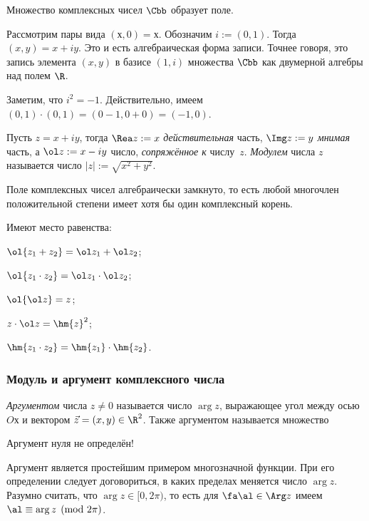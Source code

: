 \documentclass[a4paper]{article}
\begin{document}
\begin{stm}
Множество комплексных чисел $\Cbb$ образует поле.
\end{stm}

Рассмотрим пары вида $(х, 0) = х$. Обозначим $i := (0,1)$. Тогда $(x,y) = x+iy$. Это и есть алгебраическая
форма записи. Точнее говоря, это запись элемента $(x,y)$ в базисе $(1,i)$ множества $\Cbb$ как двумерной
алгебры над полем $\R$.

Заметим, что $i^2= -1$. Действительно, имеем $(0,1)\cdot(0,1) = (0 - 1, 0 + 0) = (-1,0)$.

Пусть $z = x + iy$, тогда $\Rea z := x$ \emph{действительная} часть, $\Img z := y$ \emph{мнимая} часть,
а $\ol z := x - iy$ число, \emph{сопряжённое к} числу~$z$. \emph{Модулем} числа $z$ называется число $|z| := \sqrt{x^2+y^2}$.

\begin{theorem}[Гаусса]
Поле комплексных чисел алгебраически замкнуто, то есть любой многочлен положительной степени
имеет хотя бы один комплексный корень.
\end{theorem}

Имеют место равенства:

\begin{points}{-2}
\item $\ol{z_1 + z_2} = \ol z_1 + \ol z_2$;
\item $\ol{z_1\cdot z_2} = \ol z_1 \cdot \ol z_2$;
\item $\ol{\ol z} = z$;
\item $z\cdot\ol z = \hm{z}^2$;
\item $\hm{z_1 \cdot z_2 } = \hm{z_1}\cdot \hm{z_2}$.
\end{points}

\subsubsection{Модуль и аргумент комплексного числа}

\begin{df}
\emph{Аргументом} числа $z\neq 0$ называется число $\arg z$, выражающее угол между осью $Oх$ и вектором $\vec z =(x,y) \in \R^2$.
Также аргументом называется множество
\end{df}

\begin{note}
Аргумент нуля не определён!
\end{note}

Аргумент является простейшим примером многозначной функции. При его определении следует договориться, в каких
пределах меняется число $\arg z$. Разумно считать, что $\arg z \in [0,2\pi)$, то есть для
$\fa \al \in \Arg z$ имеем $\al \equiv \arg z \pmod{2\pi}$.
\end{document}
